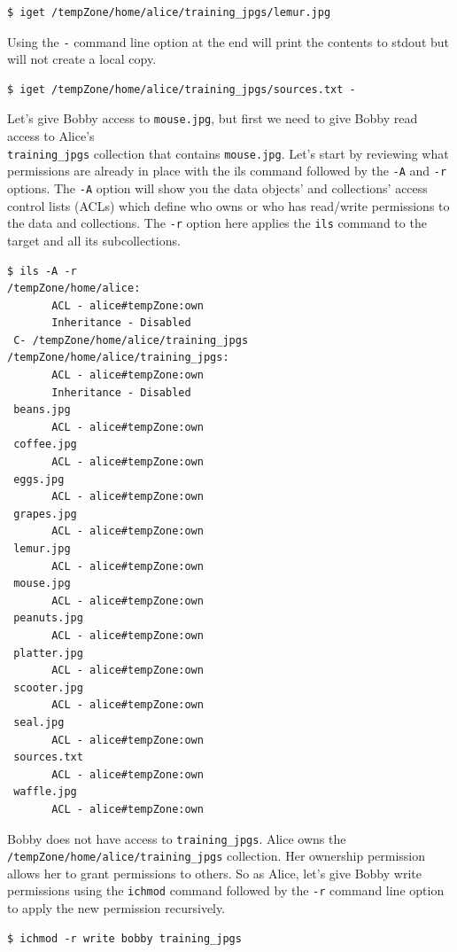 \documentclass[10pt,oneside]{memoir}
\begin{document}
\begin{lstlisting}
$ iget /tempZone/home/alice/training_jpgs/lemur.jpg
\end{lstlisting}

Using the \texttt{-} command line option at the end will print the contents to stdout but will not create a local copy.

\begin{lstlisting}
$ iget /tempZone/home/alice/training_jpgs/sources.txt -
\end{lstlisting}

Let's give Bobby access to \texttt{mouse.jpg}, but first we need to give Bobby read access to Alice's \\
\texttt{training\_jpgs} collection that contains \texttt{mouse.jpg}. Let's start by reviewing what permissions are already in place with the ils command followed by the \texttt{-A} and \texttt{-r} options. The \texttt{-A} option will show you the data objects' and collections' access control lists (ACLs) which define who owns or who has read/write permissions to the data and collections. The \texttt{-r} option here applies the \texttt{ils} command to the target and all its subcollections.

\begin{lstlisting}
$ ils -A -r
/tempZone/home/alice:
       ACL - alice#tempZone:own
       Inheritance - Disabled
 C- /tempZone/home/alice/training_jpgs
/tempZone/home/alice/training_jpgs:
       ACL - alice#tempZone:own
       Inheritance - Disabled
 beans.jpg
       ACL - alice#tempZone:own
 coffee.jpg
       ACL - alice#tempZone:own
 eggs.jpg
       ACL - alice#tempZone:own
 grapes.jpg
       ACL - alice#tempZone:own
 lemur.jpg
       ACL - alice#tempZone:own
 mouse.jpg
       ACL - alice#tempZone:own
 peanuts.jpg
       ACL - alice#tempZone:own
 platter.jpg
       ACL - alice#tempZone:own
 scooter.jpg
       ACL - alice#tempZone:own
 seal.jpg
       ACL - alice#tempZone:own
 sources.txt
       ACL - alice#tempZone:own
 waffle.jpg
       ACL - alice#tempZone:own
\end{lstlisting}

Bobby does not have access to \texttt{training\_jpgs}. Alice owns the \texttt{/tempZone/home/alice/training\_jpgs} collection. Her ownership permission allows her to grant permissions to others. So as Alice, let's give Bobby write permissions using the \texttt{ichmod} command followed by the \texttt{-r} command line option to apply the new permission recursively.

\begin{lstlisting}
$ ichmod -r write bobby training_jpgs
\end{lstlisting}
\end{document}
